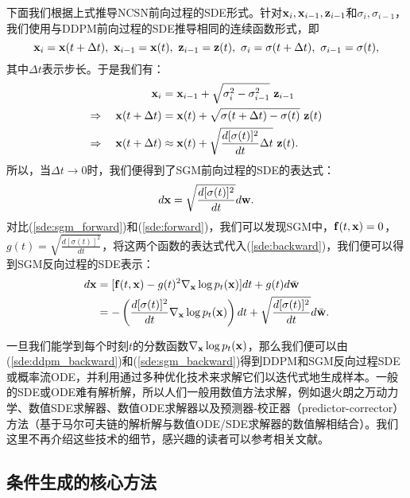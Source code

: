\documentclass[11pt,a4paper,UTF8]{ctexart}
\begin{document}
下面我们根据上式推导NCSN前向过程的SDE形式。针对$\mathbf{x}_i,\mathbf{x}_{i-1},\mathbf{z}_{i-1}$和$\sigma_i,\sigma_{i-1}$，我们使用与DDPM前向过程的SDE推导相同的连续函数形式，即
\begin{equation*}
    \x_i=\x(t+\Delta t),\ \x_{i-1}=\x(t),\ \z_{i-1}=\z(t),\ \sigma_i = \sigma(t+\Delta t),\ \sigma_{i-1} = \sigma(t),
\end{equation*}
其中$\Delta t$表示步长。于是我们有：
\begin{align*}
    \mathbf{x}_i &= \mathbf{x}_{i-1} + \sqrt{\sigma_i^2-\sigma_{i-1}^2}\ \mathbf{z}_{i-1} \\
    \Rightarrow\quad \mathbf{x}(t+\Delta t) &=\mathbf{x}(t) + \sqrt{\sigma(t+\Delta t) -\sigma(t)}\ \mathbf{z}(t) \\
    \Rightarrow\quad \mathbf{x}(t+\Delta t) &\approx \mathbf{x}(t) + \sqrt{\frac{d[\sigma(t)]^2}{dt}\Delta t}\ \mathbf{z}(t).
\end{align*}
所以，当$\Delta t\rightarrow 0$时，我们便得到了SGM前向过程的SDE的表达式：
\begin{equation}
    d\mathbf{x} = \sqrt{\frac{d[\sigma(t)]^2}{dt}}d\mathbf{w}.
\label{sde:sgm_forward}
\end{equation}
对比(\ref{sde:sgm_forward})和(\ref{sde:forward})，我们可以发现SGM中，$\mathbf{f}(t,\mathbf{x})=0$，$g(t)=\sqrt{\frac{d[\sigma(t)]^2}{dt}}$，将这两个函数的表达式代入(\ref{sde:backward})，我们便可以得到SGM反向过程的SDE表示：
\begin{align}
\begin{split}
    d\mathbf{x} &= [\mathbf{f}(t,\mathbf{x}) - g(t)^2 \nabla_{\mathbf{x}} \log p_t(\mathbf{x}) ]dt + g(t)d\bar{\mathbf{w}} \\
    &= -\left(\frac{d[\sigma(t)]^2}{dt} \nabla_{\mathbf{x}} \log p_t(\mathbf{x}) \right)dt + \sqrt{\frac{d[\sigma(t)]^2}{dt}} d\bar{\mathbf{w}}.
\end{split} 
\label{sde:sgm_backward}
\end{align}

一旦我们能学到每个时刻$t$的分数函数$\nabla_{\mathbf{x}}\log p_t(\mathbf{x})$，那么我们便可以由(\ref{sde:ddpm_backward})和(\ref{sde:sgm_backward})得到DDPM和SGM反向过程SDE或概率流ODE，并利用通过多种优化技术来求解它们以迭代式地生成样本。一般的SDE或ODE难有解析解，所以人们一般用数值方法求解，例如退火朗之万动力学\cite{song2019generative}、数值SDE求解器\cite{jolicoeur2021gotta,song2020score}、数值ODE求解器\cite{karras2022elucidating,lu2022dpm,song2020denoising,song2020score}以及预测器-校正器（predictor-corrector）方法（基于马尔可夫链的解析解与数值ODE/SDE求解器的数值解相结合）\cite{song2020score}。我们这里不再介绍这些技术的细节，感兴趣的读者可以参考相关文献。

\subsection{条件生成的核心方法}
\end{document}

